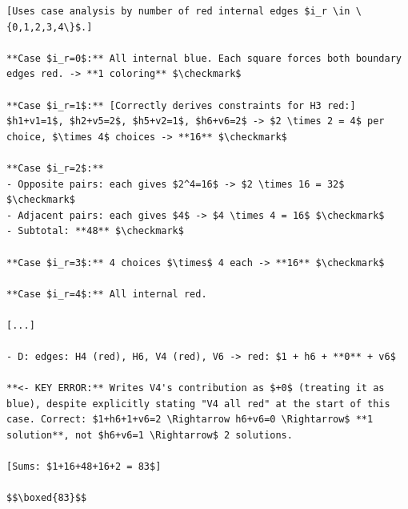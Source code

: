 \smallskip
\begin{tcolorbox}[
  enhanced, breakable, width=\linewidth,
  colback=orange!3, colframe=orange!50,
  title={\textbf{$RL_{individual}$}, single inconsistent state update},
  fonttitle=\sffamily, coltitle=black
]
\begin{Verbatim}[fontsize=\footnotesize, breaklines, breakanywhere]
[Uses case analysis by number of red internal edges $i_r \in \{0,1,2,3,4\}$.]

**Case $i_r=0$:** All internal blue. Each square forces both boundary edges red. -> **1 coloring** $\checkmark$

**Case $i_r=1$:** [Correctly derives constraints for H3 red:] $h1+v1=1$, $h2+v5=2$, $h5+v2=1$, $h6+v6=2$ -> $2 \times 2 = 4$ per choice, $\times 4$ choices -> **16** $\checkmark$

**Case $i_r=2$:**
- Opposite pairs: each gives $2^4=16$ -> $2 \times 16 = 32$ $\checkmark$
- Adjacent pairs: each gives $4$ -> $4 \times 4 = 16$ $\checkmark$
- Subtotal: **48** $\checkmark$

**Case $i_r=3$:** 4 choices $\times$ 4 each -> **16** $\checkmark$

**Case $i_r=4$:** All internal red.

[...]

- D: edges: H4 (red), H6, V4 (red), V6 -> red: $1 + h6 + **0** + v6$

**<- KEY ERROR:** Writes V4's contribution as $+0$ (treating it as blue), despite explicitly stating "V4 all red" at the start of this case. Correct: $1+h6+1+v6=2 \Rightarrow h6+v6=0 \Rightarrow$ **1 solution**, not $h6+v6=1 \Rightarrow$ 2 solutions.

[Sums: $1+16+48+16+2 = 83$]

$$\boxed{83}$$
\end{Verbatim}

\end{tcolorbox}


